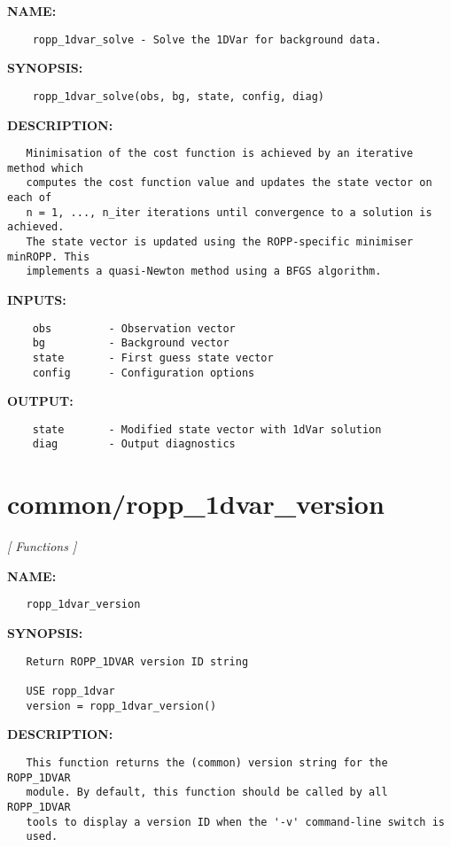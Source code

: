 \label{ch:robo5}
\label{ch:1DVar_ropp_1dvar_solve}
\textbf{NAME:}\hspace{0.08in}\begin{Verbatim}
    ropp_1dvar_solve - Solve the 1DVar for background data.
\end{Verbatim}
\textbf{SYNOPSIS:}\hspace{0.08in}\begin{Verbatim}
    ropp_1dvar_solve(obs, bg, state, config, diag)
\end{Verbatim}
\textbf{DESCRIPTION:}\hspace{0.08in}\begin{Verbatim}
   Minimisation of the cost function is achieved by an iterative method which
   computes the cost function value and updates the state vector on each of
   n = 1, ..., n_iter iterations until convergence to a solution is achieved.
   The state vector is updated using the ROPP-specific minimiser minROPP. This
   implements a quasi-Newton method using a BFGS algorithm.
\end{Verbatim}
\textbf{INPUTS:}\hspace{0.08in}\begin{Verbatim}
    obs         - Observation vector
    bg          - Background vector
    state       - First guess state vector
    config      - Configuration options
\end{Verbatim}
\textbf{OUTPUT:}\hspace{0.08in}\begin{Verbatim}
    state       - Modified state vector with 1dVar solution
    diag        - Output diagnostics
\end{Verbatim}
\section{common/ropp\_1dvar\_version}
\textsl{[ Functions ]}

\label{ch:robo6}
\label{ch:common_ropp_1dvar_version}
\textbf{NAME:}\hspace{0.08in}\begin{Verbatim}
   ropp_1dvar_version
\end{Verbatim}
\textbf{SYNOPSIS:}\hspace{0.08in}\begin{Verbatim}
   Return ROPP_1DVAR version ID string

   USE ropp_1dvar
   version = ropp_1dvar_version()
\end{Verbatim}
\textbf{DESCRIPTION:}\hspace{0.08in}\begin{Verbatim}
   This function returns the (common) version string for the ROPP_1DVAR
   module. By default, this function should be called by all ROPP_1DVAR
   tools to display a version ID when the '-v' command-line switch is
   used.
\end{Verbatim}
